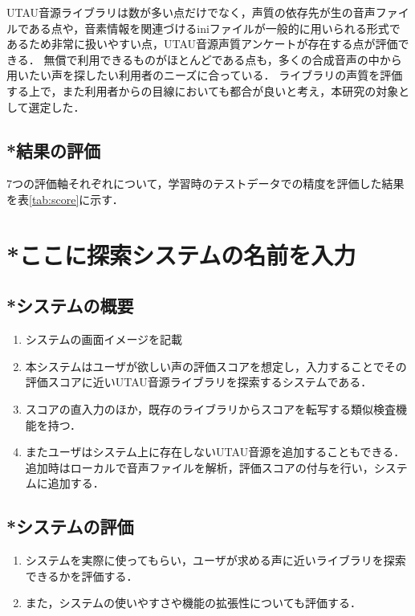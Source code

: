\documentclass[a4j,8pt,twocolumn]{extarticle}
\begin{document}
UTAU音源ライブラリは数が多い点だけでなく，声質の依存先が生の音声ファイルである点や，音素情報を関連づけるiniファイルが一般的に用いられる形式であるため非常に扱いやすい点，UTAU音源声質アンケートが存在する点が評価できる．
無償で利用できるものがほとんどである点も，多くの合成音声の中から用いたい声を探したい利用者のニーズに合っている．
ライブラリの声質を評価する上で，また利用者からの目線においても都合が良いと考え，本研究の対象として選定した．

\subsection{*結果の評価}
7つの評価軸それぞれについて，学習時のテストデータでの精度を評価した結果を表\ref{tab:score}に示す．

\section{*ここに探索システムの名前を入力}
\subsection{*システムの概要}
\begin{enumerate}
  \item システムの画面イメージを記載
  \item 本システムはユーザが欲しい声の評価スコアを想定し，入力することでその評価スコアに近いUTAU音源ライブラリを探索するシステムである．
  \item スコアの直入力のほか，既存のライブラリからスコアを転写する類似検査機能を持つ．
  \item またユーザはシステム上に存在しないUTAU音源を追加することもできる．追加時はローカルで音声ファイルを解析，評価スコアの付与を行い，システムに追加する．
\end{enumerate}

\subsection{*システムの評価}
\begin{enumerate}
  \item システムを実際に使ってもらい，ユーザが求める声に近いライブラリを探索できるかを評価する．
  \item また，システムの使いやすさや機能の拡張性についても評価する．
\end{enumerate}

\end{document}
